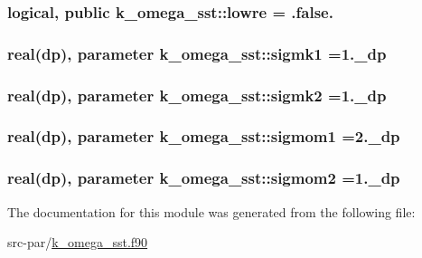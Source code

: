 \hypertarget{classk__omega__sst_afd70039b4073095a5203e788db819119}{
\subsubsection[{lowre}]{\setlength{\rightskip}{0pt plus 5cm}logical, public k\-\_\-omega\-\_\-sst\-::lowre = .false.}}\label{classk__omega__sst_afd70039b4073095a5203e788db819119}
\hypertarget{classk__omega__sst_a4859960d166f5aae3a709b6914d17858}{
\subsubsection[{sigmk1}]{\setlength{\rightskip}{0pt plus 5cm}real(dp), parameter k\-\_\-omega\-\_\-sst\-::sigmk1 =1.\-\_\-dp}}\label{classk__omega__sst_a4859960d166f5aae3a709b6914d17858}
\hypertarget{classk__omega__sst_a62372426f37f88c0155f05bb8026909f}{
\subsubsection[{sigmk2}]{\setlength{\rightskip}{0pt plus 5cm}real(dp), parameter k\-\_\-omega\-\_\-sst\-::sigmk2 =1.\-\_\-dp}}\label{classk__omega__sst_a62372426f37f88c0155f05bb8026909f}
\hypertarget{classk__omega__sst_a0cb7552eb69f1919ecff80bb2e5808e4}{
\subsubsection[{sigmom1}]{\setlength{\rightskip}{0pt plus 5cm}real(dp), parameter k\-\_\-omega\-\_\-sst\-::sigmom1 =2.\-\_\-dp}}\label{classk__omega__sst_a0cb7552eb69f1919ecff80bb2e5808e4}
\hypertarget{classk__omega__sst_ad43aa7379d6ca2d18b6b38168e683ac3}{
\subsubsection[{sigmom2}]{\setlength{\rightskip}{0pt plus 5cm}real(dp), parameter k\-\_\-omega\-\_\-sst\-::sigmom2 =1.\-\_\-dp}}\label{classk__omega__sst_ad43aa7379d6ca2d18b6b38168e683ac3}


The documentation for this module was generated from the following file\-:\begin{DoxyCompactItemize}
\item 
src-\/par/\hyperlink{k__omega__sst_8f90}{k\-\_\-omega\-\_\-sst.\-f90}\end{DoxyCompactItemize}
